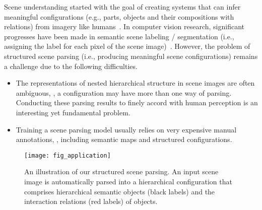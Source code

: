 \documentclass[10pt,twocolumn,letterpaper]{article}
\begin{document}
Scene understanding started with the goal of creating systems that can infer meaningful configurations (e.g., parts, objects and their compositions with relations) from imagery like humans~\cite{DBLP:ImageParsing-Attribute}. In computer vision research, significant progresses have been made in semantic scene labeling / segmentation (i.e., assigning the label for each pixel of the scene image)~\cite{DBLP:SemanSeg-1}\cite{DBLP:SemanSeg-3}\cite{DBLP:FCnetwork}\cite{DBLP:RecursiveContext}. However, the problem of structured scene parsing (i.e., producing meaningful scene configurations) remains a challenge due to the following difficulties.

\begin{itemize}

\item The representations of nested hierarchical structure in scene images are often ambiguous, \eg, a configuration may have more than one way of parsing. Conducting these parsing results to finely accord with human perception is an interesting yet fundamental problem.



\item Training a scene parsing model usually relies on very expensive manual annotations, \eg, including semantic maps and structured configurations.

\end{itemize}

\begin{figure}[t]
\centering
\texttt{[image: fig\_application]}
\caption{An illustration of our structured scene parsing. An input scene image is automatically parsed into a hierarchical configuration that comprises hierarchical semantic objects (black labels) and the interaction relations (red labels) of objects.}
\label{fig:application}
\vspace{-4mm}
\end{figure}
\end{document}

